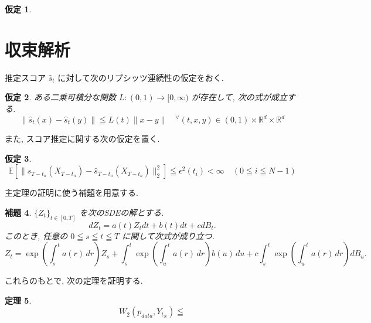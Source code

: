 \documentclass[11pt,a4paper]{ltjsarticle}
\newtheorem{theorem}{定理}[section]
\newtheorem{lemma}[theorem]{補題}
\newtheorem{assumption}[theorem]{仮定}
\theoremstyle{remark}
\begin{document}
\begin{assumption}

\end{assumption}


\section{収束解析}
推定スコア $\hat{s}_t$ に対して次のリプシッツ連続性の仮定をおく.
\begin{assumption}
    ある二乗可積分な関数 $L:(0,1)\rightarrow [0,\infty)$ が存在して, 次の式が成立する.
    \begin{equation}
        \|\hat{s}_t(x)-\hat{s}_t(y)\|\leqq L(t)\|x-y\| \quad  ^{\forall}(t,x,y)\in (0,1)\times \mathbb{R}^d\times \mathbb{R}^d
    \end{equation}
\end{assumption}
また, スコア推定に関する次の仮定を置く.
\begin{assumption}
    \begin{equation}
        \mathbb{E}[\|s_{T-t_n}(X_{T-t_n})-\hat{s}_{T-t_n}(X_{T-t_n})\|_2^2]\leqq \epsilon^2(t_i)<\infty\quad (0\leqq i \leqq N-1)
    \end{equation}
\end{assumption}
主定理の証明に使う補題を用意する.
\begin{lemma}
    $\{Z_t\}_{t\in[0,T]}$ を次のSDEの解とする.
    \begin{equation}
        dZ_t=a(t)Z_tdt+b(t)dt+cdB_t .
    \end{equation}
    このとき, 任意の $0\leqq s \leqq t \leqq T$ に関して次式が成り立つ.
    \begin{equation}
        Z_t
        =
        \exp\left(\int_s^t a(r)\,dr\right)Z_s
        +
        \int_s^t
        \exp\left(\int_u^t a(r)\,dr\right)b(u)\,du
        +
        c\int_s^t
        \exp\left(\int_u^t a(r)\,dr\right)dB_u .
    \end{equation}
\end{lemma}
これらのもとで, 次の定理を証明する.
\begin{theorem}
    \begin{equation}
        W_2(p_{data}, Y_{t_N})\leqq 
    \end{equation}
\end{theorem}
\end{document}
